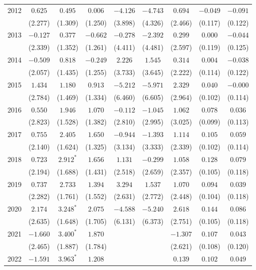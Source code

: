 \begin{table}[htbp]
{\begin{tabular}{lcccccccc}
2012 & $0.625$ & $0.495$ & $0.006$ & $-4.126$ & $-4.743$ & $0.694$ & $-0.049$ & $-0.091$ \\
 & (2.277) & (1.309) & (1.250) & (3.898) & (4.326) & (2.466) & (0.117) & (0.122) \\
2013 & $-0.127$ & $0.377$ & $-0.662$ & $-0.278$ & $-2.392$ & $0.299$ & $0.000$ & $-0.044$ \\
 & (2.339) & (1.352) & (1.261) & (4.411) & (4.481) & (2.597) & (0.119) & (0.125) \\
2014 & $-0.509$ & $0.818$ & $-0.249$ & $2.226$ & $1.545$ & $0.314$ & $0.004$ & $-0.038$ \\
 & (2.057) & (1.435) & (1.255) & (3.733) & (3.645) & (2.222) & (0.114) & (0.122) \\
2015 & $1.434$ & $1.180$ & $0.913$ & $-5.212$ & $-5.971$ & $2.329$ & $0.040$ & $-0.000$ \\
 & (2.784) & (1.469) & (1.334) & (6.460) & (6.605) & (2.964) & (0.102) & (0.114) \\
2016 & $0.550$ & $1.946$ & $1.070$ & $-0.112$ & $-1.045$ & $1.062$ & $0.078$ & $0.036$ \\
 & (2.823) & (1.528) & (1.382) & (2.810) & (2.995) & (3.025) & (0.099) & (0.113) \\
2017 & $0.755$ & $2.405$ & $1.650$ & $-0.944$ & $-1.393$ & $1.114$ & $0.105$ & $0.059$ \\
 & (2.140) & (1.624) & (1.325) & (3.134) & (3.333) & (2.339) & (0.102) & (0.114) \\
2018 & $0.723$ & $2.912^{*}$ & $1.656$ & $1.131$ & $-0.299$ & $1.058$ & $0.128$ & $0.079$ \\
 & (2.194) & (1.688) & (1.431) & (2.518) & (2.659) & (2.357) & (0.105) & (0.118) \\
2019 & $0.737$ & $2.733$ & $1.394$ & $3.294$ & $1.537$ & $1.070$ & $0.094$ & $0.039$ \\
 & (2.282) & (1.761) & (1.552) & (2.631) & (2.772) & (2.448) & (0.104) & (0.118) \\
2020 & $2.174$ & $3.248^{*}$ & $2.075$ & $-4.588$ & $-5.240$ & $2.618$ & $0.144$ & $0.086$ \\
 & (2.635) & (1.648) & (1.705) & (6.131) & (6.373) & (2.751) & (0.105) & (0.118) \\
2021 & $-1.660$ & $3.400^{*}$ & $1.870$ &  &  & $-1.307$ & $0.107$ & $0.043$ \\
 & (2.465) & (1.887) & (1.784) &  &  & (2.621) & (0.108) & (0.120) \\
2022 & $-1.591$ & $3.963^{*}$ & $1.208$ &  &  & $0.139$ & $0.102$ & $0.049$ \\

\end{tabular}}
\end{table}
